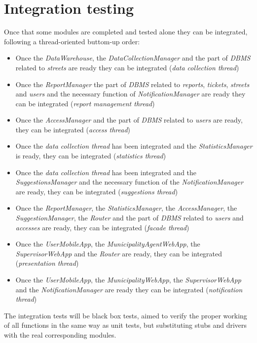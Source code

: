 \documentclass[a4paper]{report}
\begin{document}
\section{Integration testing}
Once that some modules are completed and tested alone they can be integrated, following a thread-oriented buttom-up order:
\begin{itemize}
\item Once the \textit{DataWarehouse}, the \textit{DataCollectionManager} and the part of \textit{DBMS} related to \textit{streets} are ready they can be integrated (\textit{data collection thread})
\item Once the \textit{ReportManager} the part of \textit{DBMS} related to \textit{reports}, \textit{tickets}, \textit{streets} and \textit{users} and the necessary function of \textit{NotificationManager} are ready they can be integrated  (\textit{report management thread})
\item Once the \textit{AccessManager} and the part of \textit{DBMS} related to \textit{users} are ready, they can be integrated (\textit{access thread})
\item Once the \textit{data collection thread} has been integrated and the \textit{StatisticsManager} is ready, they can be integrated  (\textit{statistics thread})
\item Once the \textit{data collection thread} has been integrated and the \textit{SuggestionsManager} and the necessary function of the \textit{NotificationManager} are ready, they can be integrated (\textit{suggestions thread})
\item Once the \textit{ReportManager}, the \textit{StatisticsManager}, the \textit{AccessManager}, the \textit{SuggestionManager}, the \textit{Router} and the part of \textit{DBMS} related to \textit{users} and \textit{accesses} are ready, they can be integrated (\textit{facade thread})
\item Once the \textit{UserMobileApp}, the \textit{MunicipalityAgentWebApp}, the \textit{SupervisorWebApp} and the \textit{Router} are ready, they can be integrated (\textit{presentation thread})
\item Once the \textit{UserMobileApp}, the \textit{MunicipalityWebApp}, the \textit{SupervisorWebApp} and the \textit{NotificationManager} are ready they can be integrated (\textit{notification thread})
\end{itemize}
The integration tests will be black box tests, aimed to verify the proper working of all functions in the same way as unit tests, but substituting stubs and drivers with the real corresponding modules.\\
\end{document}
